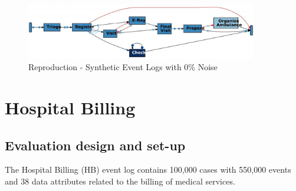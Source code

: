 \begin{figure}[H]
\begin{center}
\includegraphics[width=0.9\textwidth]{Chapters/Graphics_Paper/Syn0NoiseReprod.jpg}
\caption{Reproduction - Synthetic Event Logs with 0\% Noise} 
\end{center}
\end{figure}




\section{Hospital Billing}
\subsection{Evaluation design and set-up}
The Hospital Billing (HB) event log contains 100,000 cases with 550,000 events and 38 data attributes related to the billing of medical services.\\

